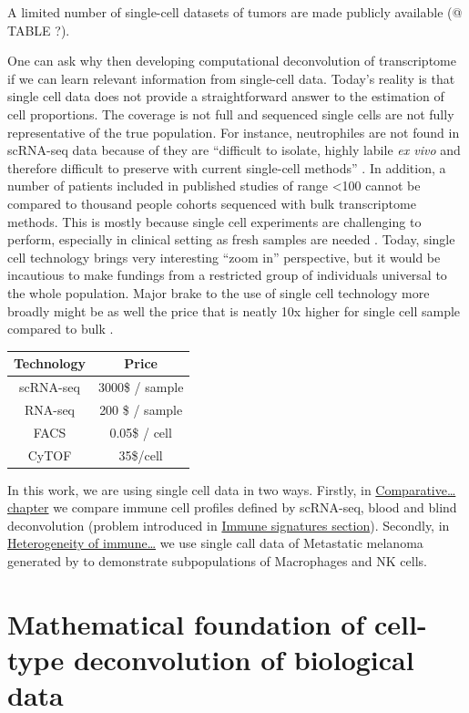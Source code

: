 \documentclass[12pt,]{book}
\theoremstyle{definition}
\theoremstyle{definition}
\theoremstyle{definition}
\theoremstyle{remark}
\begin{document}
A limited number of single-cell datasets of tumors are made publicly
available (@ TABLE ?).

One can ask why then developing computational deconvolution of
transcriptome if we can learn relevant information from single-cell
data. Today's reality is that single cell data does not provide a
straightforward answer to the estimation of cell proportions. The
coverage is not full and sequenced single cells are not fully
representative of the true population. For instance, neutrophiles are
not found in scRNA-seq data because of they are ``difficult to isolate,
highly labile \emph{ex vivo} and therefore difficult to preserve with
current single-cell methods'' \citep{Schelker2017}. In addition, a
number of patients included in published studies of range \textless{}100
cannot be compared to thousand people cohorts sequenced with bulk
transcriptome methods. This is mostly because single cell experiments
are challenging to perform, especially in clinical setting as fresh
samples are needed \citep{Schelker2017}. Today, single cell technology
brings very interesting ``zoom in'' perspective, but it would be
incautious to make fundings from a restricted group of individuals
universal to the whole population. Major brake to the use of single cell
technology more broadly might be as well the price that is neatly 10x
higher for single cell sample compared to bulk \citep{Cedar2018}.

\begin{longtable}[]{@{}cc@{}}
\toprule
Technology & Price\tabularnewline
\midrule
\endhead
scRNA-seq & 3000\$ / sample\tabularnewline
RNA-seq & 200 \$ / sample\tabularnewline
FACS & 0.05\$ / cell\tabularnewline
CyTOF & 35\$/cell\tabularnewline
\bottomrule
\end{longtable}

In this work, we are using single cell data in two ways. Firstly, in
\protect\hyperlink{results}{Comparative\ldots{} chapter} we compare
immune cell profiles defined by scRNA-seq, blood and blind deconvolution
(problem introduced in \protect\hyperlink{immune-signatures}{Immune
signatures section}). Secondly, in \protect\hyperlink{map}{Heterogeneity
of immune\ldots{}} we use single call data of Metastatic melanoma
generated by \citet{Tirosh2016} to demonstrate subpopulations of
Macrophages and NK cells.

\hypertarget{methods}{%
\chapter{Mathematical foundation of cell-type deconvolution of
biological data}\label{methods}}
\end{document}
